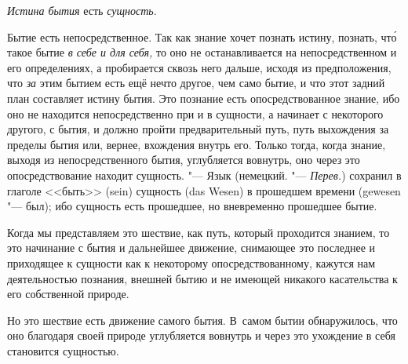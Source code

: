 {\em Истина бытия} есть {\em сущность}.

Бытие есть непосредственное. Так как знание хочет познать истину, познать,
чт\'{о} такое бытие {\em в себе и для себя,} то оно не
останавливается на непосредственном и его определениях, а пробирается
сквозь него дальше, исходя из предположения, что
{\em за} этим бытием есть ещё нечто другое, чем само
бытие, и что этот задний план составляет истину бытия. Это познание есть
опосредствованное знание, ибо оно не находится непосредственно при и в
сущности, а начинает с некоторого другого, с бытия, и должно пройти
предварительный путь, путь выхождения за пределы бытия или, вернее,
вхождения внутрь его. Только тогда, когда знание, выходя из
непосредственного бытия, углубляется вовнутрь, оно через это
опосредствование находит сущность. "--- Язык (немецкий. "--- {\em Перев.})
сохранил в глаголе <<быть>> (sein) сущность (das Wesen) в прошедшем времени
(gewesen "--- был); ибо сущность есть прошедшее, но вневременно прошедшее
бытие.

Когда мы представляем это шествие, как путь, который проходится знанием, то
это начинание с бытия и дальнейшее движение, снимающее это последнее и
приходящее к сущности как к некоторому опосредствованному, кажутся нам
деятельностью познания, внешней бытию и не имеющей никакого касательства к
его собственной природе.

Но это шествие есть движение самого бытия. В~самом бытии обнаружилось, что
оно благодаря своей природе углубляется вовнутрь и через это ухождение в
себя становится сущностью.

